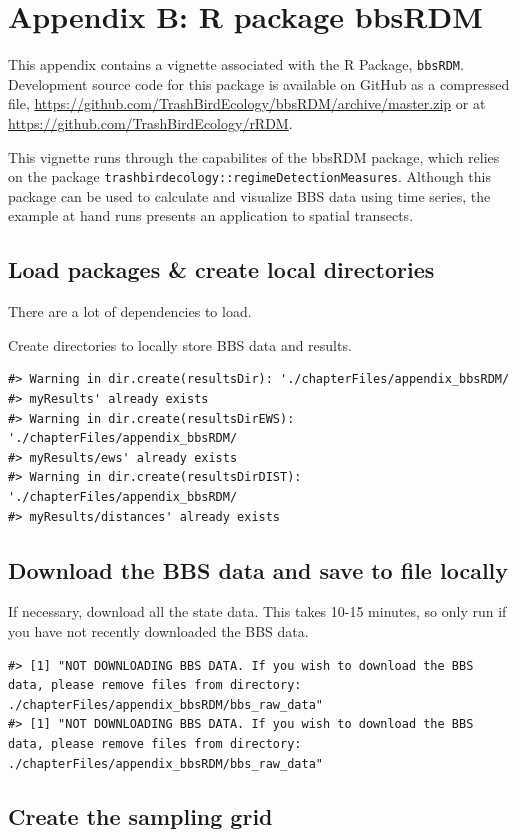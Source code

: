 \documentclass[12pt,twoside,openany]{reedthesis}
\begin{document}
\hypertarget{bbsRDM}{%
\chapter*{Appendix B: R package bbsRDM}\label{bbsRDM}}

This appendix contains a vignette associated with the R Package, \texttt{bbsRDM}. Development source code for this package is available on GitHub as a compressed file, \url{https://github.com/TrashBirdEcology/bbsRDM/archive/master.zip} or at \url{https://github.com/TrashBirdEcology/rRDM}.

This vignette runs through the capabilites of the bbsRDM package, which relies on the package \texttt{trashbirdecology::regimeDetectionMeasures}. Although this package can be used to calculate and visualize BBS data using time series, the example at hand runs presents an application to spatial transects.

\hypertarget{load-packages-create-local-directories}{%
\section{Load packages \& create local directories}\label{load-packages-create-local-directories}}

There are a lot of dependencies to load.

Create directories to locally store BBS data and results.
\begin{verbatim}
#> Warning in dir.create(resultsDir): './chapterFiles/appendix_bbsRDM/
#> myResults' already exists
#> Warning in dir.create(resultsDirEWS): './chapterFiles/appendix_bbsRDM/
#> myResults/ews' already exists
#> Warning in dir.create(resultsDirDIST): './chapterFiles/appendix_bbsRDM/
#> myResults/distances' already exists
\end{verbatim}
\hypertarget{download-the-bbs-data-and-save-to-file-locally}{%
\section{Download the BBS data and save to file locally}\label{download-the-bbs-data-and-save-to-file-locally}}

If necessary, download all the state data. This takes 10-15 minutes, so only run if you have not recently downloaded the BBS data.
\begin{verbatim}
#> [1] "NOT DOWNLOADING BBS DATA. If you wish to download the BBS data, please remove files from directory: ./chapterFiles/appendix_bbsRDM/bbs_raw_data"
#> [1] "NOT DOWNLOADING BBS DATA. If you wish to download the BBS data, please remove files from directory: ./chapterFiles/appendix_bbsRDM/bbs_raw_data"
\end{verbatim}
\hypertarget{create-the-sampling-grid}{%
\section{Create the sampling grid}\label{create-the-sampling-grid}}
\end{document}
